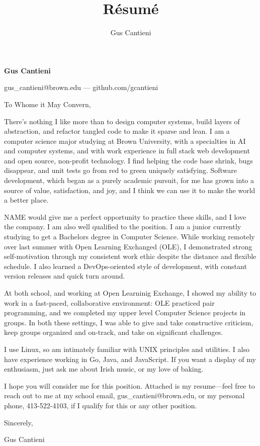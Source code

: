 \documentclass[12pt]{article}
\title{R\'esum\'e}
\author{Gus Cantieni}
\makeatletter
\renewcommand{\maketitle}{
	\begin{center}
		{\huge\bfseries Gus Cantieni}
		\vspace{0.25em}

		gus\_cantieni@brown.edu --- github.com/gcantieni

		\vspace{0.75em}
	\end{center}
}
\makeatother
\begin{document}
\maketitle

\vspace{1em}
\fontsize{12}{15}\selectfont
\noindent
To Whome it May Convern, 
\vspace{1em}

\noindent
There's nothing I like more than to design computer systems, build layers of abstraction, and refactor tangled code to make it sparse and lean. I am a computer science major studying at Brown University, with a specialties in AI and computer systems, and with work experience in full stack web development and open source, non-profit technology. I find helping the code base shrink, bugs disappear, and unit tests go from red to green uniquely satisfying. Software development, which began as a purely academic pursuit, for me has grown into a source of value, satisfaction, and joy, and I think we can use it to make the world a better place.
\vspace{0.75em}

\noindent
NAME would give me a perfect opportunity to practice these skills, and I love the company. I am also well qualified to the position. I am a junior currently studying to get a Bachelors degree in Computer Science. While working remotely over last summer with Open Learning Exchanged (OLE), I demonstrated strong self-motivation through my consistent work ethic despite the distance and flexible schedule. I also learned a DevOps-oriented style of development, with constant version releases and quick turn around. 

\vspace{0.75em}
\noindent
At both school, and working at Open Learninig Exchange, I showed my ability to work in a fast-paced, collaborative environment: OLE practiced pair programming, and we completed my upper level Computer Science projects in groups. In both these settings, I was able to give and take constructive criticism, keep groups organized and on-track, and take on significant challenges. 

\vspace{0.75em}
\noindent
I use Linux, so am intimately familiar with UNIX principles and utilities. I also have experience working in Go, Java, and JavaScript. If you want a display of my enthusiasm, just ask me about Irish music, or my love of baking.  

\vspace{0.75em}
\noindent
I hope you will consider me for this position. Attached is my resume---feel free to reach out to me at my school email, gus\_cantieni@brown.edu, or my personal phone, 413-522-4103, if I qualify for this or any other position.


\vspace{2em}
\hfill Sincerely,

\hfill Gus Cantieni
\end{document}

